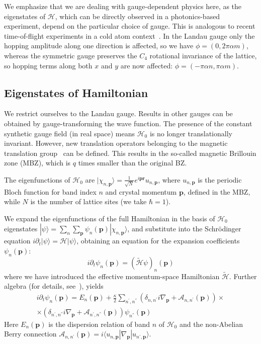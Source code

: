 \documentclass[twocolumn, 10pt, aps, superscriptaddress, floatfix, showpacs, pra, citeautoscript]{revtex4-1}
\newcommand{\vt}[1]{\mathbf{#1}}
\newcommand{\bra}[1]{\langle #1|}
\newcommand{\ket}[1]{|#1\rangle}
\begin{document}
We emphasize that we are dealing with gauge-dependent physics here, as
the eigenstates of $\mathcal{H}$, which can be directly observed in a
photonics-based experiment, depend on the particular choice of
gauge. This is analogous to recent time-of-flight experiments in a
cold atom context~\cite{kennedy2015bec,spielman2011gauge}.
%
In the Landau gauge only the hopping amplitude along one direction is
affected, so we have $\phi = (0, 2\pi\alpha m)$, whereas the symmetric
gauge preserves the $C_4$ rotational invariance of the lattice, so hopping
terms along both $x$ and $y$ are now affected:
$\phi = (-\pi\alpha n, \pi\alpha m)$.


\subsection{Eigenstates of Hamiltonian}\label{sec:eigenstates}
We restrict ourselves to the Landau gauge. Results in other gauges can
be obtained by gauge-transforming the wave function.  The presence of
the constant synthetic gauge field (in real space) means
$\mathcal{H}_0$ is no longer translationally invariant. However, new
translation operators belonging to the magnetic translation
group~\cite{zak1964group, zak1964representations} can be defined. This
results in the so-called magnetic Brillouin zone (MBZ), which is $q$
times smaller than the original BZ.

The eigenfunctions of $\mathcal{H}_0$ are
$\ket{\chi_{n,\vt{p}}} = \frac{1}{\sqrt{N}} e^{i\vt{p}\vt{r}}
u_{n,\vt{p}}$,
where $u_{n,\vt{p}}$ is the periodic Bloch function for band index $n$
and crystal momentum $\vt{p}$, defined in the MBZ, while $N$ is the
number of lattice sites (we take $\hbar = 1$).

We expand the eigenfunctions of the full Hamiltonian in the basis of
$\mathcal{H}_0$ eigenstates
$\ket{\psi} = \sum_n\sum_{\vt{p}} \psi_n(\vt{p})
\ket{\chi_{n,\vt{p}}}$,
and substitute into the Schr\"{o}dinger equation
$i \partial_t \ket{\psi} = \mathcal{H} \ket{\psi}$, obtaining an
equation for the expansion coefficients $\psi_n(\vt{p})$:
\begin{equation}
  i \partial_t \psi_n(\vt{p}) = (\widetilde{\mathcal{H}} \psi)_n(\vt{p})
\end{equation}
where we have introduced the effective momentum-space Hamiltonian
$\widetilde{\mathcal{H}}$. Further algebra (for details,
see~\cite{price2014magnetic}), yields
%
\begin{multline}
  i \partial_t \psi_n(\vt{p}) = E_n(\vt{p}) + \frac{\kappa}{2}\sum_{n^{'},n^{''}}\left(\delta_{n,n^{'}}i \nabla_{\vt{p}} + \mathcal{A}_{n,n^{'}}(\vt{p})\right)\times \\ \times \left(\delta_{n^{'},n^{''}}i\nabla_{\vt{p}} + \mathcal{A}_{n^{'},n^{''}}(\vt{p})\right) \psi_{n^{''}}(\vt{p})
\end{multline}
Here $E_n(\vt{p})$ is the dispersion relation of band $n$ of $\mathcal{H}_0$ and the non-Abelian Berry connection $\mathcal{A}_{n,n^{'}}(\vt{p}) = i\bra{u_{n,\vt{p}}}\nabla_{\vt{p}}\ket{u_{n^{'},\vt{p}}}$. 
\end{document}
